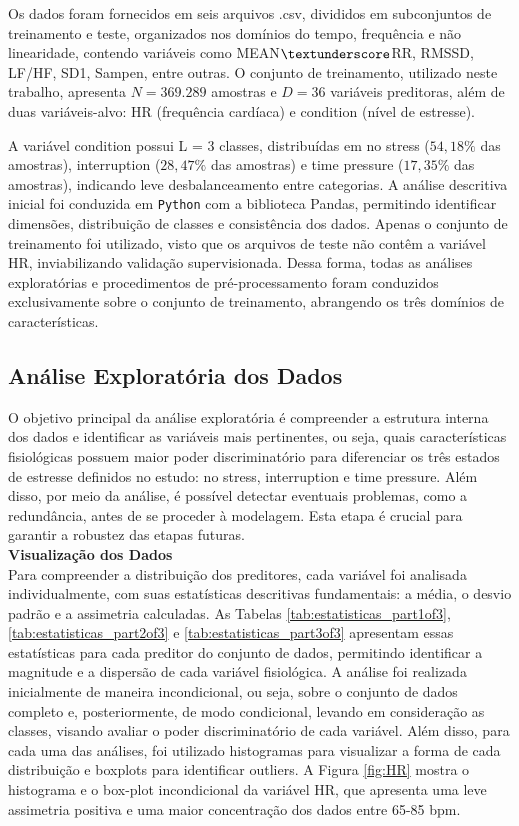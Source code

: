\documentclass[conference]{IEEEtran}
\begin{document}
Os dados foram fornecidos em seis arquivos .csv, divididos em subconjuntos de treinamento e teste, organizados nos domínios do tempo, frequência e não linearidade, contendo variáveis como MEAN$\textunderscore$RR, RMSSD, LF/HF, SD1, Sampen, entre outras. O conjunto de treinamento, utilizado neste trabalho, apresenta $N = 369.289$ amostras e $D = 36$ variáveis preditoras, além de duas variáveis-alvo: HR (frequência cardíaca) e condition (nível de estresse).

A variável condition possui L = 3 classes, distribuídas em no stress ($54,18\%$ das amostras), interruption ($28,47\%$ das amostras) e time pressure ($17,35\%$ das amostras), indicando leve desbalanceamento entre categorias. A análise descritiva inicial foi conduzida em {\tt Python} com a biblioteca Pandas, permitindo identificar dimensões, distribuição de classes e consistência dos dados. Apenas o conjunto de treinamento foi utilizado, visto que os arquivos de teste não contêm a variável HR, inviabilizando validação supervisionada. Dessa forma, todas as análises exploratórias e procedimentos de pré-processamento foram conduzidos exclusivamente sobre o conjunto de treinamento, abrangendo os três domínios de características.

\subsection{Análise Exploratória dos Dados}

O objetivo principal da análise exploratória é compreender a estrutura interna dos dados e identificar as variáveis mais pertinentes, ou seja, quais características fisiológicas possuem maior poder discriminatório para diferenciar os três estados de estresse definidos no estudo: no stress, interruption e time pressure. Além disso, por meio da análise, é possível detectar eventuais problemas, como a redundância, antes de se proceder à modelagem. Esta etapa é crucial para garantir a robustez das etapas futuras.\\

\noindent \textbf{Visualização dos Dados}\\

Para compreender a distribuição dos preditores, cada variável foi analisada individualmente, com suas estatísticas descritivas fundamentais: a média, o desvio padrão e a assimetria calculadas. As Tabelas \ref{tab:estatisticas_part1of3}, \ref{tab:estatisticas_part2of3} e \ref{tab:estatisticas_part3of3} apresentam essas estatísticas para cada preditor do conjunto de dados, permitindo identificar a magnitude e a dispersão de cada variável fisiológica. A análise foi realizada inicialmente de maneira incondicional, ou seja, sobre o conjunto de dados completo e, posteriormente, de modo condicional, levando em consideração as classes, visando avaliar o poder discriminatório de cada variável. Além disso, para cada uma das análises, foi  utilizado histogramas para visualizar a forma de cada distribuição e boxplots para identificar outliers. A Figura \ref{fig:HR} mostra o histograma e o box-plot incondicional da variável HR, que apresenta uma leve assimetria positiva e uma maior concentração dos dados entre 65-85 bpm. 
\end{document}
